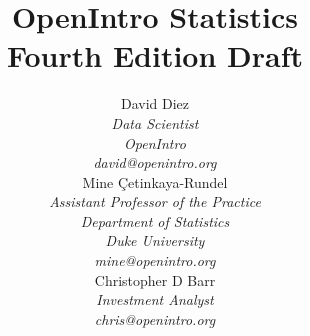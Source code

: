 
\title{\huge OpenIntro Statistics\vspace{1.5mm} \\
    \Large Fourth Edition Draft}
\author{David Diez \\
\small\emph{Data Scientist} \\
\small\emph{OpenIntro} \\
\vspace{6mm}%
\small\emph{david@openintro.org} \\
Mine \c{C}etinkaya-Rundel \\
\small\emph{Assistant Professor of the Practice} \\
\small\emph{Department of Statistics} \\
\small\emph{Duke University} \\
\vspace{6mm}%
\small\emph{mine@openintro.org} \\
Christopher D Barr \\
\small\emph{Investment Analyst} \\
\small\emph{chris@openintro.org}}

